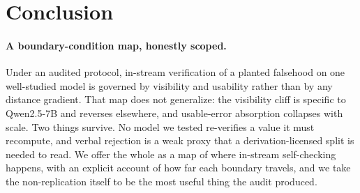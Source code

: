 \section{Conclusion}
\label{sec:conclusion}


\paragraph{A boundary-condition map, honestly scoped.} Under an audited
protocol, in-stream verification of a planted falsehood on one well-studied
model is governed by visibility and usability rather than by any distance
gradient. That map does not generalize: the visibility cliff is specific to
Qwen2.5-7B and reverses elsewhere, and usable-error absorption collapses with
scale. Two things survive. No model we tested re-verifies a value it must
recompute, and verbal rejection is a weak proxy that a derivation-licensed
split is needed to read. We offer the whole as a map of where in-stream
self-checking happens, with an explicit account of how far each boundary
travels, and we take the non-replication itself to be the most useful thing
the audit produced.
